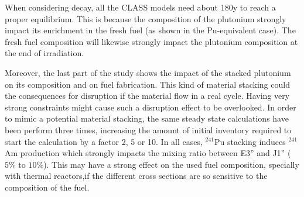 \documentclass[12pt]{article}
\begin{document}
When considering decay, all the CLASS models need about 180y to reach a proper
equilibrium. This is because the composition of the plutonium strongly impact
its enrichment in the fresh fuel (as shown in the Pu-equivalent case). The fresh
fuel composition will likewise strongly impact the plutonium composition at the
end of irradiation. 

Moreover, the last part of the study shows the impact of the stacked plutonium
on its composition and on fuel fabrication. This kind of material stacking could
the consequences for disruption if the material flow in a real cycle. Having
very strong constraints might cause such a disruption effect to be overlooked.
In order to mimic a potential material stacking, the same steady state
calculations have been perform three times, increasing the amount of initial
inventory required to start the calculation by a factor 2, 5 or 10. In all
cases, $^{241}$Pu stacking induces $^{241}$Am production which strongly impacts
the mixing ratio between E3'' and J1'' ( $5\%$ to $10\%$). This may have a
strong effect on the used fuel composition, specially with thermal reactors,if
the different cross sections are so sensitive to the composition of the fuel.








\end{document}
